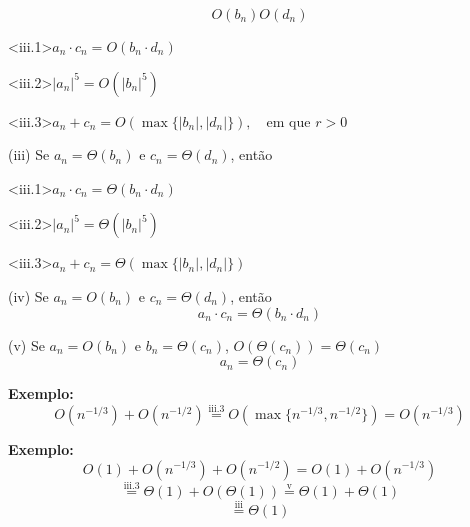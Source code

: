 \[
O(b_n) O(d_n)
\]

\noindent \textless iii.1\textgreater \quad $a_n \cdot c_n = O(b_n \cdot d_n)$

\noindent \textless iii.2\textgreater \quad $|a_n|^5 = O(|b_n|^5)$

\noindent \textless iii.3\textgreater \quad $a_n + c_n = O\left( \max\{ |b_n|, |d_n| \} \right), \quad \text{em que } r > 0$

\noindent (iii) Se $a_n = \Theta(b_n)$ e $c_n = \Theta(d_n)$, então

\noindent \textless iii.1\textgreater \quad $a_n \cdot c_n = \Theta(b_n \cdot d_n)$

\noindent \textless iii.2\textgreater \quad $|a_n|^5 = \Theta(|b_n|^5)$

\noindent \textless iii.3\textgreater \quad $a_n + c_n = \Theta\left( \max\{ |b_n|, |d_n| \} \right)$

\noindent (iv) Se $a_n = O(b_n)$ e $c_n = \Theta(d_n)$, então
\[
a_n \cdot c_n = \Theta(b_n \cdot d_n)
\]

\noindent (v) Se $a_n = O(b_n)$ e $b_n = \Theta(c_n)$, $O(\Theta(c_n)) = \Theta(c_n)$
\[
a_n = \Theta(c_n)
\]

\noindent \textbf{Exemplo:}
\[
O(n^{-1/3}) + O(n^{-1/2}) \overset{\text{iii.3}}{=} O\left( \max\{ n^{-1/3}, n^{-1/2} \} \right) = O(n^{-1/3})
\]

\noindent \textbf{Exemplo:}
\[
O(1) + O(n^{-1/3}) + O(n^{-1/2}) = O(1) + O(n^{-1/3})
\]
\[
\overset{\text{iii.3}}{=} \Theta(1) + O(\Theta(1)) \overset{\text{v}}{=} \Theta(1) + \Theta(1)
\]
\[
\overset{\text{iii}}{=} \Theta(1)
\]